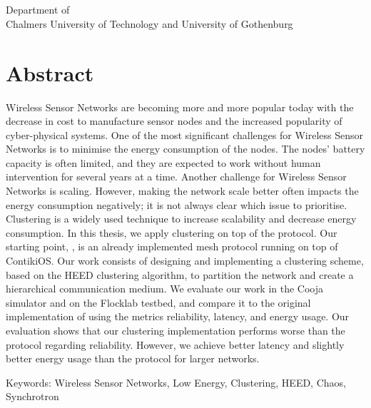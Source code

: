 \headline\\
\subtitle\\
\authors\\
Department of \department\\
Chalmers University of Technology and University of Gothenburg\setlength{\parskip}{0.5cm}

\thispagestyle{plain}			%
\setlength{\parskip}{0pt plus 1.0pt}
\section*{Abstract}

Wireless Sensor Networks are becoming more and more popular today with the decrease in cost to manufacture sensor nodes and the increased popularity of cyber-physical systems. One of the most significant challenges for Wireless Sensor Networks is to minimise the energy consumption of the nodes. The nodes' battery capacity is often limited, and they are expected to work without human intervention for several years at a time. Another challenge for Wireless Sensor Networks is scaling. However, making the network scale better often impacts the energy consumption negatively; it is not always clear which issue to prioritise. Clustering is a widely used technique to increase scalability and decrease energy consumption. In this thesis, we apply clustering on top of the \atwo{} protocol. Our starting point, \atwo{}, is an already implemented mesh protocol running on top of ContikiOS. Our work consists of designing and implementing a clustering scheme, based on the HEED clustering algorithm, to partition the network and create a hierarchical communication medium. We evaluate our work in the Cooja simulator and on the Flocklab testbed, and compare it to the original implementation of \atwo{} using the metrics reliability, latency, and energy usage. Our evaluation shows that our clustering implementation performs worse than the \atwo{} protocol regarding reliability. However, we achieve better latency and slightly better energy usage than the \atwo{} protocol for larger networks.

\vfill
Keywords: Wireless Sensor Networks, Low Energy, Clustering, HEED, Chaos, \atwo{} Synchrotron

\newpage				%
\thispagestyle{empty}
\mbox{}